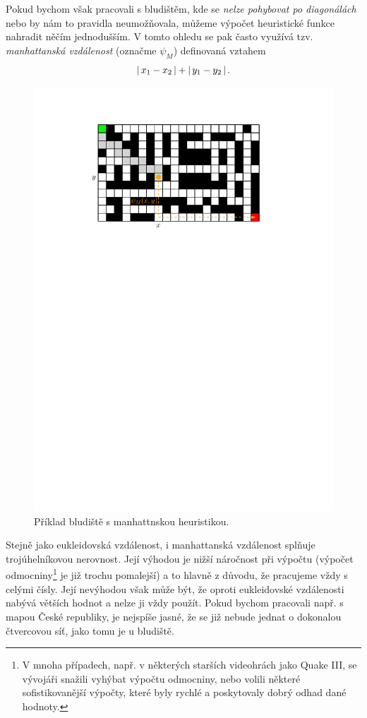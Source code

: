 Pokud bychom však pracovali s bludištěm, kde se \emph{nelze pohybovat po diagonálách} nebo by nám to pravidla neumožňovala, můžeme výpočet heuristické funkce nahradit něčím jednodušším. V tomto ohledu se pak často využívá tzv. \emph{manhattanská vzdálenost} (označme $\psi_M$) definovaná vztahem
\[\left|\,x_1-x_2\,\right|+\left|\,y_1-y_2\,\right|.\]
\begin{figure}[h]
    \centering
    \includegraphics[scale=\graphimgsize]{components/images/ch01_astar_mrizka_manhattan.pdf}
    \caption{Příklad bludiště s manhattnskou heuristikou.}
    \label{fig:astar_bludiste_manhattan}
\end{figure}
Stejně jako eukleidovská vzdálenost, i manhattanská vzdálenost splňuje trojúhelníkovou nerovnost. Její výhodou je nižší náročnost při výpočtu (výpočet odmocniny\footnote{V mnoha případech, např. v některých starších videohrách jako Quake III, se vývojáři snažili vyhýbat výpočtu odmocniny, nebo volili některé sofistikovanější výpočty, které byly rychlé a poskytovaly dobrý odhad dané hodnoty.} je již trochu pomalejší) a to hlavně z důvodu, že pracujeme vždy s celými čísly. Její nevýhodou však může být, že oproti eukleidovské vzdálenosti nabývá větších hodnot a nelze ji vždy použít. Pokud bychom pracovali např. s mapou České republiky, je nejspíše jasné, že se již nebude jednat o dokonalou čtvercovou síť, jako tomu je u bludiště.